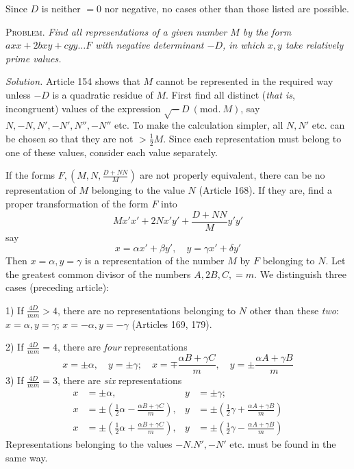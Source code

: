 Since $D$ is neither $=0$ nor negative, no cases other than those listed are possible.

\textsc{Problem.} \textit{Find all representations of a given number $M$ by the form $axx+2bxy+cyy\ldots F$ with negative determinant $-D$, in which $x,y$ take relatively prime values.}

\textit{Solution.} Article 154 shows that $M$ cannot be represented in the required way unless $-D$ is a quadratic residue of $M$. First find all distinct (\textit{that is}, incongruent) values of the expression $\surd-D\ (\mathrm{mod.}\ M)$, say $N,-N,N',-N',N'',-N''$ etc. To make the calculation simpler, all $N,N'$ etc. can be chosen so that they are not $>\tfrac12M$. Since each representation must belong to one of these values, consider each value separately.

If the forms $F,(M,N,\frac{D+NN}{M})$ are not properly equivalent, there can be no representation of $M$ belonging to the value $N$ (Article 168). If they are, find a proper transformation of the form $F$ into
\[
Mx'x'+2Nx'y'+\frac{D+NN}{M}y'y'
\]
say
\[
x=\alpha x'+\beta y',\quad y=\gamma x'+\delta y'
\]
Then $x=\alpha,y=\gamma$ is a representation of the number $M$ by $F$ belonging to $N$. Let the greatest common divisor of the numbers $A,2B,C,=m$. We distinguish three cases (preceding article):

1) If $\frac{4D}{mm}>4$, there are no representations belonging to $N$ other than these \textit{two}: $x=\alpha,y=\gamma$; $x=-\alpha,y=-\gamma$ (Articles 169, 179).

2) If $\frac{4D}{mm}=4$, there are \textit{four} representations
\[
x=\pm\alpha,\quad y=\pm\gamma;\quad x=\mp\frac{\alpha B+\gamma C}{m},\quad y=\pm\frac{\alpha A+\gamma B}{m}
\]
3) If $\frac{4D}{mm}=3$, there are \textit{six} representations
\[
\begin{aligned}
x&=\pm\alpha,&y&=\pm\gamma;\\
x&=\pm(\tfrac12\alpha-\tfrac{\alpha B+\gamma C}{m}),&y&=\pm(\tfrac12\gamma+\tfrac{\alpha A+\gamma B}{m})\\
x&=\pm(\tfrac12\alpha+\tfrac{\alpha B+\gamma C}{m}),&y&=\pm(\tfrac12\gamma-\tfrac{\alpha A+\gamma B}{m})
\end{aligned}
\]
Representations belonging to the values $-N.N',-N'$ etc. must be found in the same way.

